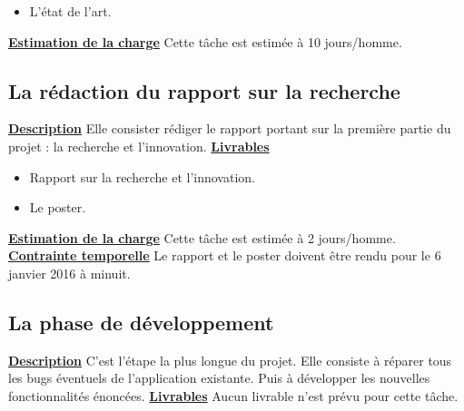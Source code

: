 \documentclass[overfullbox]{polytech/polytech}
\begin{document}
\begin{itemize}
\item L'état de l'art.
\newline
\end{itemize}	

\textbf{\underline{Estimation de la charge}}
\newline
\newline
Cette tâche est estimée à 10 jours/homme.

\subsection{La rédaction du rapport sur la recherche}
\textbf{\underline{Description}}
\newline
\newline
Elle consister rédiger le rapport portant sur la première partie du projet : la recherche et l'innovation.
\newline
\newline
\textbf{\underline{Livrables}}

\begin{itemize}
\item Rapport sur la recherche et l'innovation.
\item Le poster.
\newline
\end{itemize}	

\textbf{\underline{Estimation de la charge}}
\newline
\newline
Cette tâche est estimée à 2 jours/homme. 
\newline
\newline
\textbf{\underline{Contrainte temporelle}}
\newline
\newline
Le rapport et le poster doivent être rendu pour le 6 janvier 2016 à minuit.

\subsection{La phase de développement}
\textbf{\underline{Description}}
\newline
\newline
C'est l'étape la plus longue du projet. Elle consiste à réparer tous les bugs éventuels de l'application existante. Puis à développer les nouvelles fonctionnalités énoncées.
\newline
\newline
\textbf{\underline{Livrables}}
\newline
\newline
Aucun livrable n'est prévu pour cette tâche.
\newline
\newline
\end{document}

